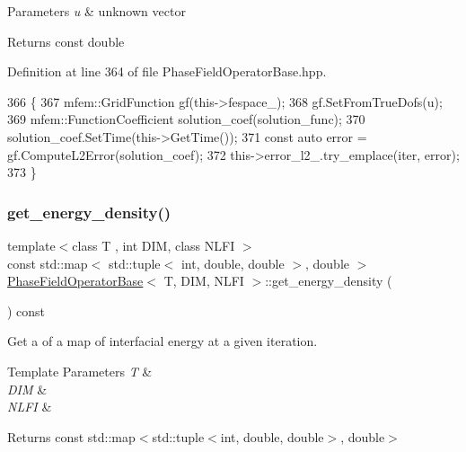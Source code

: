 \begin{DoxyParams}{Parameters}
{\em u} & unknown vector \\
\hline
\end{DoxyParams}
\begin{DoxyReturn}{Returns}
const double 
\end{DoxyReturn}


Definition at line 364 of file Phase\+Field\+Operator\+Base.\+hpp.


\begin{DoxyCode}
366                                                                    \{
367   mfem::GridFunction gf(this->fespace\_);
368   gf.SetFromTrueDofs(u);
369   mfem::FunctionCoefficient solution\_coef(solution\_func);
370   solution\_coef.SetTime(this->GetTime());
371   \textcolor{keyword}{const} \textcolor{keyword}{auto} error = gf.ComputeL2Error(solution\_coef);
372   this->error\_l2\_.try\_emplace(iter, error);
373 \}
\end{DoxyCode}
\mbox{\label{classPhaseFieldOperatorBase_a8428da5d747f60f7ccbd79c879ca8d25}} 
\subsubsection{\texorpdfstring{get\+\_\+energy\+\_\+density()}{get\_energy\_density()}}
{\footnotesize\ttfamily template$<$class T , int D\+IM, class N\+L\+FI $>$ \\
const std\+::map$<$ std\+::tuple$<$ int, double, double $>$, double $>$ \hyperlink{classPhaseFieldOperatorBase}{Phase\+Field\+Operator\+Base}$<$ T, D\+IM, N\+L\+FI $>$\+::get\+\_\+energy\+\_\+density (\begin{DoxyParamCaption}{ }\end{DoxyParamCaption}) const\hspace{0.3cm}{\ttfamily [inherited]}}



Get a of a map of interfacial energy at a given iteration. 


\begin{DoxyTemplParams}{Template Parameters}
{\em T} & \\
\hline
{\em D\+IM} & \\
\hline
{\em N\+L\+FI} & \\
\hline
\end{DoxyTemplParams}
\begin{DoxyReturn}{Returns}
const std\+::map$<$std\+::tuple$<$int, double, double$>$, double$>$ 
\end{DoxyReturn}


